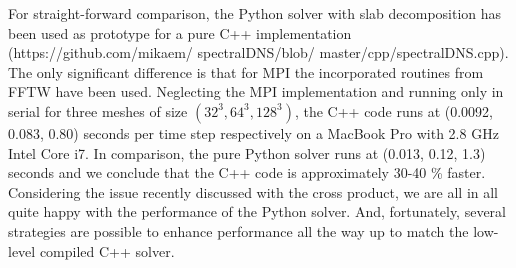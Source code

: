 \documentclass[11pt, oneside]{article}
\begin{document}
For straight-forward comparison, the Python solver with slab decomposition has been used as prototype for a pure C++ implementation (https://github.com/mikaem/ spectralDNS/blob/ master/cpp/spectralDNS.cpp). The only significant difference is that for MPI the incorporated routines from FFTW have been used. Neglecting the MPI implementation and running only in serial for three meshes of size $(32^3, 64^3, 128^3)$, the C++ code runs at (0.0092, 0.083, 0.80) seconds per time step respectively on a MacBook Pro with 2.8 GHz Intel Core i7. In comparison, the pure Python solver runs at (0.013, 0.12, 1.3) seconds and we conclude that the C++ code is approximately 30-40 \% faster. Considering the issue recently discussed with the cross product, we are all in all quite happy with the performance of the Python solver.  And, fortunately, several strategies are possible to enhance performance all the way up to match the low-level compiled C++ solver. 
\end{document}
